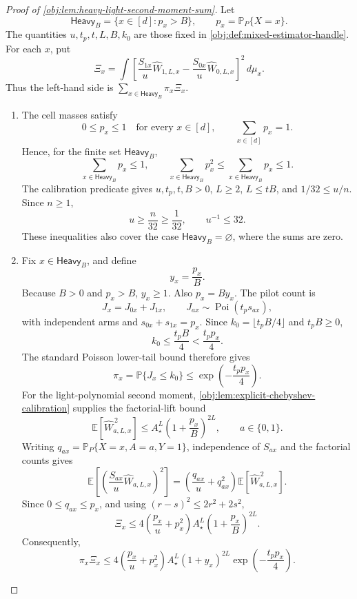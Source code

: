 \documentclass[11pt]{article}
\begin{document}
\begin{proof}[Proof of \cref{obj:lem:heavy-light-second-moment-sum}]
Let
\[
\mathsf{Heavy}_B=\{x\in[d]:p_x>B\},
\qquad
p_x=\mathbb P_P\{X=x\}.
\]
The quantities \(u,t_p,t,L,B,k_0\) are those fixed in \cref{obj:def:mixed-estimator-handle}. For each \(x\), put
\[
\Xi_x
=
\int
\left[
\frac{S_{1x}}u\widehat W_{1,L,x}
-
\frac{S_{0x}}u\widehat W_{0,L,x}
\right]^2\,d\mu_x .
\]
Thus the left-hand side is \(\sum_{x\in\mathsf{Heavy}_B}\pi_x\Xi_x\).

\begin{enumerate}
\item The cell masses satisfy
\[
0\le p_x\le1
\quad\text{for every }x\in[d],
\qquad
\sum_{x\in[d]}p_x=1.
\]
Hence, for the finite set \(\mathsf{Heavy}_B\),
\[
\sum_{x\in\mathsf{Heavy}_B}p_x\le1,
\qquad
\sum_{x\in\mathsf{Heavy}_B}p_x^2
\le
\sum_{x\in\mathsf{Heavy}_B}p_x
\le1.
\]
The calibration predicate gives \(u,t_p,t,B>0\), \(L\ge2\), \(L\le tB\), and \(1/32\le u/n\). Since \(n\ge1\),
\[
u\ge \frac n{32}\ge \frac1{32},
\qquad
u^{-1}\le32.
\]
These inequalities also cover the case \(\mathsf{Heavy}_B=\varnothing\), where the sums are zero. %

\item Fix \(x\in\mathsf{Heavy}_B\), and define
\[
y_x=\frac{p_x}{B}.
\]
Because \(B>0\) and \(p_x>B\), \(y_x\ge1\). Also \(p_x=By_x\). The pilot count is
\[
J_x=J_{0x}+J_{1x},
\qquad
J_{ax}\sim\operatorname{Poi}(t_ps_{ax}),
\]
with independent arms and \(s_{0x}+s_{1x}=p_x\). Since \(k_0=\lfloor t_pB/4\rfloor\) and \(t_pB\ge0\),
\[
k_0\le \frac{t_pB}{4}<\frac{t_pp_x}{4}.
\]
The standard Poisson lower-tail bound therefore gives
\[
\pi_x
=
\mathbb P\{J_x\le k_0\}
\le
\exp\!\left(-\frac{t_pp_x}{4}\right).
\]
For the light-polynomial second moment, \cref{obj:lem:explicit-chebyshev-calibration} supplies the factorial-lift bound
\[
\mathbb E\!\left[\widehat W_{a,L,x}^{\,2}\right]
\le
A_\star^L\left(1+\frac{p_x}{B}\right)^{2L},
\qquad a\in\{0,1\}.
\]
Writing \(q_{ax}=\mathbb P_P\{X=x,A=a,Y=1\}\), independence of \(S_{ax}\) and the factorial counts gives
\[
\mathbb E\!\left[
\left(\frac{S_{ax}}u\widehat W_{a,L,x}\right)^2
\right]
=
\left(\frac{q_{ax}}u+q_{ax}^2\right)
\mathbb E\!\left[\widehat W_{a,L,x}^{\,2}\right].
\]
Since \(0\le q_{ax}\le p_x\), and using \((r-s)^2\le2r^2+2s^2\),
\[
\Xi_x
\le
4\left(\frac{p_x}{u}+p_x^2\right)
A_\star^L\left(1+\frac{p_x}{B}\right)^{2L}.
\]
Consequently,
\[
\pi_x\Xi_x
\le
4\left(\frac{p_x}{u}+p_x^2\right)
A_\star^L(1+y_x)^{2L}
\exp\!\left(-\frac{t_pp_x}{4}\right).
\] %


\end{enumerate}
\end{proof}
\end{document}

